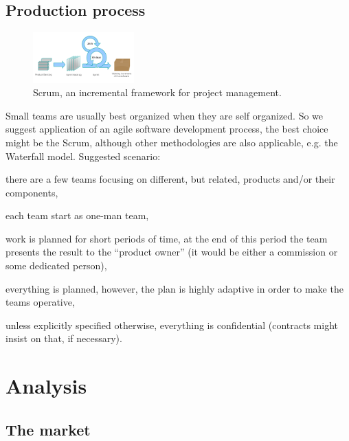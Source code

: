 \documentclass[a4paper,twoside,15pt]{book}
\begin{document}
	\section{Production process}
		\enlargethispage{4\baselineskip}
		\begin{figure}
			\centering{}
			\includegraphics[width=110pt]{images/Scrum_process.png}
			\caption{Scrum, an incremental framework for project management.}
		\end{figure}
		Small teams are usually best organized when they are self organized. So we suggest application of an agile software development process, the best choice might be the Scrum, although other methodologies are also applicable, e.g. the Waterfall model.
		Suggested scenario:
		\begin{dinglist}{73}
			\item there are a few teams focusing on different, but related, products and/or their components,
			\item each team start as one-man team,
			\item work is planned for short periods of time, at the end of this period the team presents the result to the ``product owner'' (it would be either a commission or some dedicated person),
			\item everything is planned, however, the plan is highly adaptive in order to make the teams operative,
			\item unless explicitly specified otherwise, everything is confidential (contracts might insist on that, if necessary).
		\end{dinglist}

\chapter{Analysis}
	\section{The market}
\end{document}
